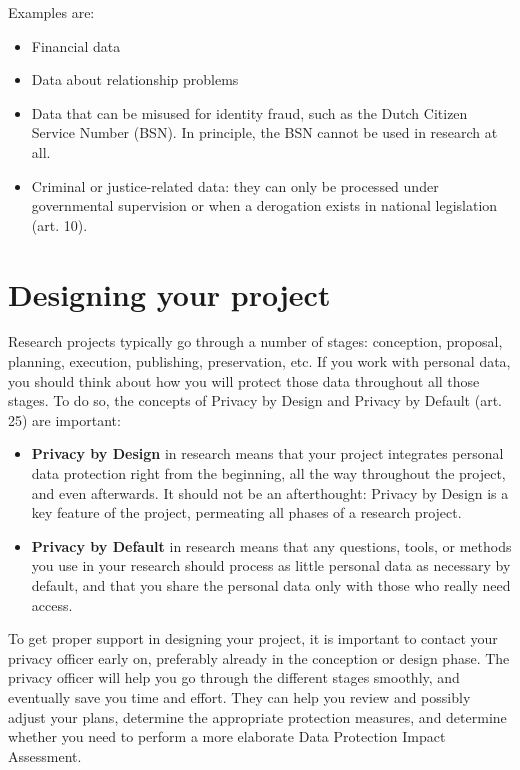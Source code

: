 \documentclass[
]{book}
\providecommand{\tightlist}{%
  \setlength{\itemsep}{0pt}\setlength{\parskip}{0pt}}
\begin{document}
Examples are:

\begin{itemize}
\tightlist
\item
  Financial data
\item
  Data about relationship problems
\item
  Data that can be misused for identity fraud, such as the Dutch Citizen
  Service Number (BSN). In principle, the BSN cannot be used in research at all.
\item
  Criminal or justice-related data: they can only be processed under
  governmental supervision or when a derogation exists in national legislation
  (art. 10).
\end{itemize}

\hypertarget{privacy-by-design}{%
\chapter{Designing your project}\label{privacy-by-design}}

Research projects typically go through a number of stages: conception, proposal,
planning, execution, publishing, preservation, etc. If you work with personal
data, you should think about how you will protect those data throughout all
those stages. To do so, the concepts of Privacy by Design and Privacy by Default
(art. 25) are
important:

\begin{itemize}
\tightlist
\item
  \textbf{Privacy by Design} in research means that your project integrates personal
  data protection right from the beginning, all the way throughout the project,
  and even afterwards. It should not be an afterthought: Privacy by Design is a
  key feature of the project, permeating all phases of a research project.
\item
  \textbf{Privacy by Default} in research means that any questions, tools, or methods
  you use in your research should process as little personal data as necessary by
  default, and that you share the personal data only with those who really need
  access.
\end{itemize}

To get proper support in designing your project, it is important to contact your
privacy officer
early on, preferably already in the conception or design phase. The privacy
officer will help you go through the different stages smoothly, and eventually
save you time and effort. They can help you review and possibly adjust your
plans, determine the appropriate protection measures, and determine whether you
need to perform a more elaborate Data Protection Impact Assessment.
\end{document}
